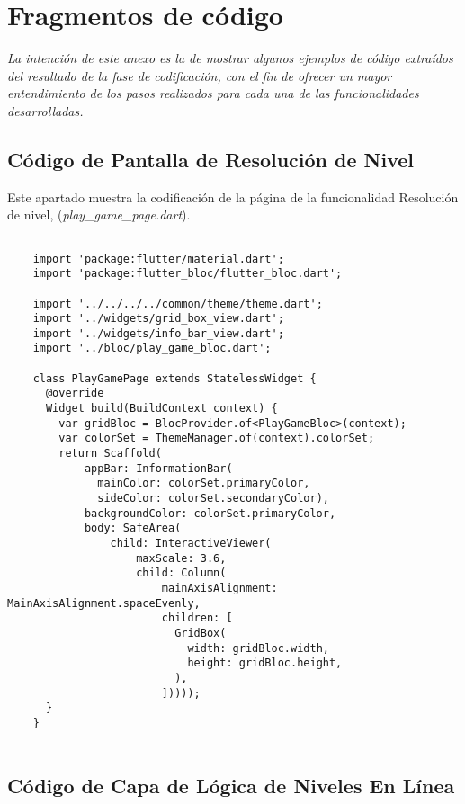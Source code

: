 \chapter{Fragmentos de código}
\label{cap:anexo2}
\textit{La intención de este anexo es la de mostrar algunos ejemplos de código extraídos del 
resultado de la fase de codificación, con el fin de ofrecer un mayor entendimiento de
los pasos realizados para cada una de las funcionalidades desarrolladas.
}

\section{Código de Pantalla de Resolución de Nivel}

\label{cap:anexo1-1}

Este apartado muestra la codificación de la página de la funcionalidad Resolución de nivel, 
(\textit{play\_game\_page.dart}).


\begin{lstlisting}

    import 'package:flutter/material.dart';
    import 'package:flutter_bloc/flutter_bloc.dart';
    
    import '../../../../common/theme/theme.dart';
    import '../widgets/grid_box_view.dart';
    import '../widgets/info_bar_view.dart';
    import '../bloc/play_game_bloc.dart';
    
    class PlayGamePage extends StatelessWidget {
      @override
      Widget build(BuildContext context) {
        var gridBloc = BlocProvider.of<PlayGameBloc>(context);
        var colorSet = ThemeManager.of(context).colorSet;
        return Scaffold(
            appBar: InformationBar(
              mainColor: colorSet.primaryColor,
              sideColor: colorSet.secondaryColor),
            backgroundColor: colorSet.primaryColor,
            body: SafeArea(
                child: InteractiveViewer(
                    maxScale: 3.6,
                    child: Column(
                        mainAxisAlignment: MainAxisAlignment.spaceEvenly,
                        children: [
                          GridBox(
                            width: gridBloc.width,
                            height: gridBloc.height,
                          ),
                        ]))));
      }
    }
    
    \end{lstlisting}

    \section{Código de Capa de Lógica de Niveles En Línea}

